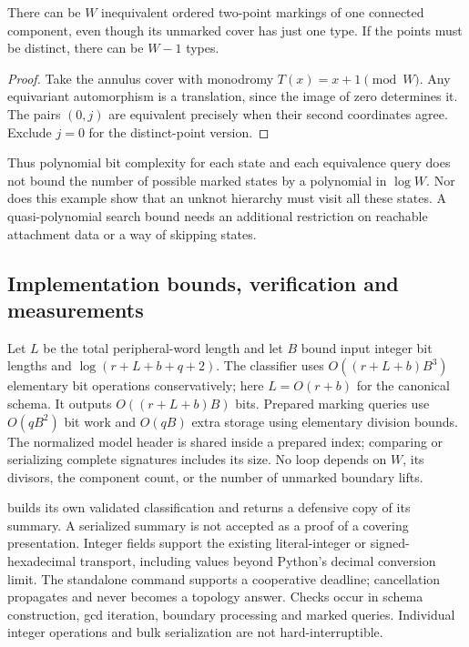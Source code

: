 \begin{proposition}
There can be $W$ inequivalent ordered two-point markings of one connected
component, even though its unmarked cover has just one type.  If the
points must be distinct, there can be $W-1$ types.
\end{proposition}
\begin{proof}
Take the annulus cover with monodromy $T(x)=x+1\pmod W$.  Any equivariant
automorphism is a translation, since the image of zero determines it.
The pairs $(0,j)$ are equivalent precisely when their second coordinates
agree.  Exclude $j=0$ for the distinct-point version.
\end{proof}
Thus polynomial bit complexity for each state and each equivalence query
does not bound the number of possible marked states by a polynomial in
$\log W$.  Nor does this example show that an unknot hierarchy must visit
all these states.  A quasi-polynomial search bound needs an additional
restriction on reachable attachment data or a way of skipping states.

\subsection{Implementation bounds, verification and measurements}

Let $L$ be the total peripheral-word length and let $B$ bound input integer
bit lengths and $\log(r+L+b+q+2)$.  The classifier uses
$O((r+L+b)B^3)$ elementary bit operations conservatively; here
$L=O(r+b)$ for the canonical schema.  It outputs
$O((r+L+b)B)$ bits.  Prepared marking queries use $O(qB^2)$ bit work
and $O(qB)$ extra storage using elementary division bounds.  The normalized
model header is shared inside a prepared index; comparing or serializing
complete signatures includes its size.  No loop depends on $W$, its
divisors, the component count, or the number of unmarked boundary lifts.

 builds its own validated classification and returns a
defensive copy of its summary.  A serialized summary is not accepted as
a proof of a covering presentation.  Integer fields support the existing
literal-integer or signed-hexadecimal transport, including values beyond
Python's decimal conversion limit.  The standalone command supports a
cooperative deadline; cancellation propagates and never becomes a topology
answer.  Checks occur in schema construction, gcd iteration, boundary
processing and marked queries.  Individual integer operations and bulk
serialization are not hard-interruptible.

